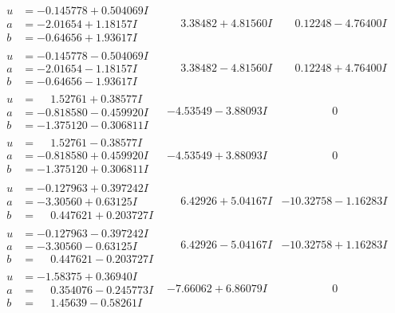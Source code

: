 \documentclass[1p]{elsarticle_modified}
\theoremstyle{definition}
\begin{document}
$$\begin{array}{c|c|c}
\begin{aligned}
u &= -0.145778 + 0.504069 I \\
a &= -2.01654 + 1.18157 I \\
b &= -0.64656 + 1.93617 I\end{aligned}
 & \phantom{-}3.38482 + 4.81560 I & \phantom{-}0.12248 - 4.76400 I \\ \hline\begin{aligned}
u &= -0.145778 - 0.504069 I \\
a &= -2.01654 - 1.18157 I \\
b &= -0.64656 - 1.93617 I\end{aligned}
 & \phantom{-}3.38482 - 4.81560 I & \phantom{-}0.12248 + 4.76400 I \\ \hline\begin{aligned}
u &= \phantom{-}1.52761 + 0.38577 I \\
a &= -0.818580 - 0.459920 I \\
b &= -1.375120 - 0.306811 I\end{aligned}
 & -4.53549 - 3.88093 I & \phantom{-0.000000 } 0 \\ \hline\begin{aligned}
u &= \phantom{-}1.52761 - 0.38577 I \\
a &= -0.818580 + 0.459920 I \\
b &= -1.375120 + 0.306811 I\end{aligned}
 & -4.53549 + 3.88093 I & \phantom{-0.000000 } 0 \\ \hline\begin{aligned}
u &= -0.127963 + 0.397242 I \\
a &= -3.30560 + 0.63125 I \\
b &= \phantom{-}0.447621 + 0.203727 I\end{aligned}
 & \phantom{-}6.42926 + 5.04167 I & -10.32758 - 1.16283 I \\ \hline\begin{aligned}
u &= -0.127963 - 0.397242 I \\
a &= -3.30560 - 0.63125 I \\
b &= \phantom{-}0.447621 - 0.203727 I\end{aligned}
 & \phantom{-}6.42926 - 5.04167 I & -10.32758 + 1.16283 I \\ \hline\begin{aligned}
u &= -1.58375 + 0.36940 I \\
a &= \phantom{-}0.354076 - 0.245773 I \\
b &= \phantom{-}1.45639 - 0.58261 I\end{aligned}
 & -7.66062 + 6.86079 I & \phantom{-0.000000 } 0 \\ \hline\begin{aligned}

\end{aligned}
\end{array}$$
\end{document}
